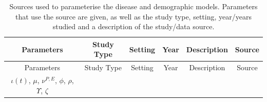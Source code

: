 \documentclass[11pt,twoside]{bristolthesis}
\begin{document}
  \begin{longtable}[]{@{}cccccc@{}}
  \caption{\label{tab:sources-tab} Sources used to parameterise the disease and demographic models. Parameters that use the source are given, as well as the study type, setting, year/years studied and a description of the study/data source.}\tabularnewline
  \toprule
  \begin{minipage}[b]{0.19\columnwidth}\centering
  Parameters\strut
  \end{minipage} & \begin{minipage}[b]{0.09\columnwidth}\centering
  Study Type\strut
  \end{minipage} & \begin{minipage}[b]{0.07\columnwidth}\centering
  Setting\strut
  \end{minipage} & \begin{minipage}[b]{0.07\columnwidth}\centering
  Year\strut
  \end{minipage} & \begin{minipage}[b]{0.31\columnwidth}\centering
  Description\strut
  \end{minipage} & \begin{minipage}[b]{0.10\columnwidth}\centering
  Source\strut
  \end{minipage}\tabularnewline
  \midrule
  \endfirsthead
  \toprule
  \begin{minipage}[b]{0.19\columnwidth}\centering
  Parameters\strut
  \end{minipage} & \begin{minipage}[b]{0.09\columnwidth}\centering
  Study Type\strut
  \end{minipage} & \begin{minipage}[b]{0.07\columnwidth}\centering
  Setting\strut
  \end{minipage} & \begin{minipage}[b]{0.07\columnwidth}\centering
  Year\strut
  \end{minipage} & \begin{minipage}[b]{0.31\columnwidth}\centering
  Description\strut
  \end{minipage} & \begin{minipage}[b]{0.10\columnwidth}\centering
  Source\strut
  \end{minipage}\tabularnewline
  \midrule
  \endhead
  \begin{minipage}[t]{0.19\columnwidth}\centering
  \(\iota(t)\),
  \(\mu\),
  \(\nu^{P, E}\),
  \(\phi\),
  \(\rho\),
  \(\Upsilon\),
  \(\zeta\)\strut
  \end{minipage} & \begin{minipage}[t]{0.09\columnwidth}\centering

\end{minipage}
\end{longtable}
\end{document}
